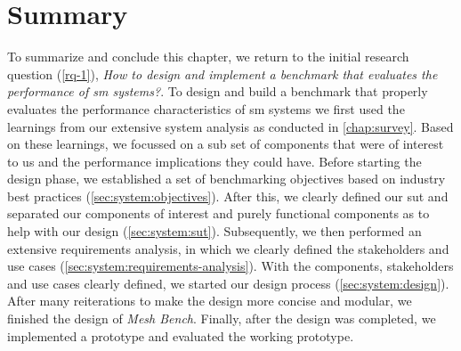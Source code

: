 \section{Summary}
\label{sec:system:summary}

To summarize and conclude this chapter, we return to the initial research question (\ref{rq-1}), \textit{How to design and implement a benchmark that evaluates the performance of \gls{sm} systems?}. To design and build a benchmark that properly evaluates the performance characteristics of \gls{sm} systems we first used the learnings from our extensive system analysis as conducted in \cref{chap:survey}. Based on these learnings, we focussed on a sub set of components that were of interest to us and the performance implications they could have. Before starting the design phase, we established a set of benchmarking objectives based on industry best practices (\cref{sec:system:objectives}). After this, we clearly defined our \gls{sut} and separated our components of interest and purely functional components as to help with our design (\cref{sec:system:sut}). Subsequently, we then performed an extensive requirements analysis, in which we clearly defined the stakeholders and use cases (\cref{sec:system:requirements-analysis}). With the components, stakeholders and use cases clearly defined, we started our design process (\cref{sec:system:design}). After many reiterations to make the design more concise and modular, we finished the design of \textit{Mesh Bench}. Finally, after the design was completed, we implemented a prototype and evaluated the working prototype.

